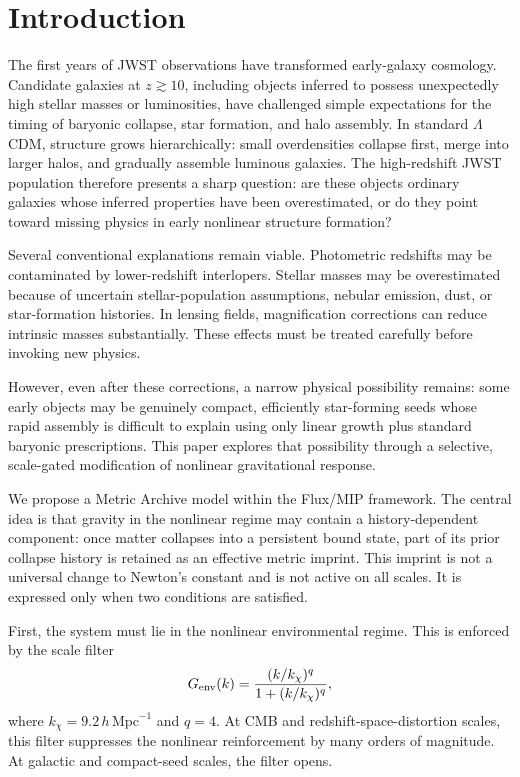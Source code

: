 \documentclass[11pt,a4paper]{article}
\newcommand{\LCDM}{$\Lambda$CDM}
\begin{document}
\section{Introduction}

The first years of JWST observations have transformed early-galaxy cosmology. Candidate galaxies at $z\gtrsim10$, including objects inferred to possess unexpectedly high stellar masses or luminosities, have challenged simple expectations for the timing of baryonic collapse, star formation, and halo assembly. In standard \LCDM, structure grows hierarchically: small overdensities collapse first, merge into larger halos, and gradually assemble luminous galaxies. The high-redshift JWST population therefore presents a sharp question: are these objects ordinary galaxies whose inferred properties have been overestimated, or do they point toward missing physics in early nonlinear structure formation?

Several conventional explanations remain viable. Photometric redshifts may be contaminated by lower-redshift interlopers. Stellar masses may be overestimated because of uncertain stellar-population assumptions, nebular emission, dust, or star-formation histories. In lensing fields, magnification corrections can reduce intrinsic masses substantially. These effects must be treated carefully before invoking new physics.

However, even after these corrections, a narrow physical possibility remains: some early objects may be genuinely compact, efficiently star-forming seeds whose rapid assembly is difficult to explain using only linear growth plus standard baryonic prescriptions. This paper explores that possibility through a selective, scale-gated modification of nonlinear gravitational response.

We propose a Metric Archive model within the Flux/MIP framework. The central idea is that gravity in the nonlinear regime may contain a history-dependent component: once matter collapses into a persistent bound state, part of its prior collapse history is retained as an effective metric imprint. This imprint is not a universal change to Newton's constant and is not active on all scales. It is expressed only when two conditions are satisfied.

First, the system must lie in the nonlinear environmental regime. This is enforced by the scale filter
\begin{equation}
G_{\rm env}(k)=\frac{(k/k_\chi)^q}{1+(k/k_\chi)^q},
\end{equation}
where $k_\chi=9.2\,h\,\mathrm{Mpc}^{-1}$ and $q=4$. At CMB and redshift-space-distortion scales, this filter suppresses the nonlinear reinforcement by many orders of magnitude. At galactic and compact-seed scales, the filter opens.
\end{document}
